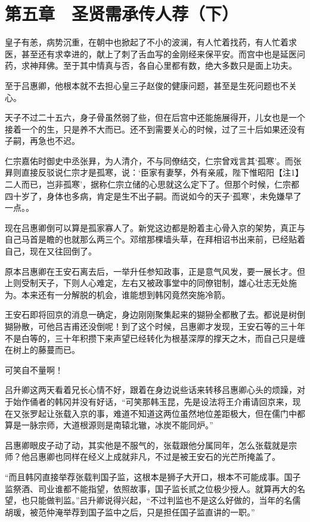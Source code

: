 \section{第五章　圣贤需承传人荐（下）}

皇子有恙，病势沉重，在朝中也掀起了不小的波澜，有人忙着找药，有人忙着求医，甚至还有求幸进的，献上了刺了舌血写的金刚经来保平安。而宫中也是延医问药，求神拜佛。至于其中情真与否，各自心里都有数，绝大多数只是面上功夫。

至于吕惠卿，他根本就不去担心皇三子赵俊的健康问题，甚至是生死问题也不关心。

天子不过二十五六，身子骨虽然弱了些，但在后宫中还能施展得开，儿女也是一个接着一个的生，只是养不大而已。还不到需要关心的时候，过了三十后如果还没有子嗣，再急也不迟。

仁宗嘉佑时御史中丞张昪，为人清介，不与同僚结交，仁宗曾戏言其‘孤寒’。而张昪则直接反驳说仁宗才是孤寒，说：‘臣家有妻孥，外有亲戚，陛下惟昭阳【注1】二人而已，岂非孤寒’，据称仁宗立储的心思就这么定下了。但那个时候，仁宗都四十岁了，身体也多病，肯定是生不出子嗣。而说如今的天子‘孤寒’，未免嫌早了一点。。

现在吕惠卿倒可以算是孤家寡人了。新党这边都是盼着主心骨入京的架势，真正与自己马首是瞻的也就那么两三个。邓绾那棵墙头草，在拜相诏书出来前，已经贴着自己，现在又往回倒了。

原本吕惠卿在王安石离去后，一举升任参知政事，正是意气风发，要一展长才。但上则受制天子，下则人心难定，左右又被政事堂中的同僚钳制，雄心壮志无处施为。本来还有一分解脱的机会，谁能想到韩冈竟然突施冷箭。

王安石即将回京的消息一确定，身边刚刚聚集起来的猢狲全都散了去。都说是树倒猢狲散，可他吕吉甫还没倒呢！到了这个时候，吕惠卿才发现，王安石等的三十年不是白等的，三十年积攒下来声望已经转化为根基深厚的撑天之木，而自己只是缠在树上的藤蔓而已。

可笑自不量啊！

吕升卿这两天看着兄长心情不好，跟着在身边说些话来转移吕惠卿心头的烦躁，对于始作俑者的韩冈并没有好话，“可笑那韩玉昆，先是设法将王介甫请回京来，现在又张罗起让张载入京的事，难道不知道这两位虽然地位差距极大，但在儒门中都算是一脉宗师，大道根源则是南辕北辙，冰炭不能同炉。”

吕惠卿眼皮子动了动，其实他是不服气的，张载跟他分属同年，怎么张载就是宗师？他吕惠卿也同样在经义上成就非凡，不过是被王安石的光芒所掩盖了。

“而且韩冈直接举荐张载判国子监，这根本是狮子大开口，根本不可能成事。国子监祭酒、司业谁都不能指望，依照故事，国子监长贰之位极少授人。就算再大的名望，也只能做判监。”吕升卿说得兴起，“不过判监也不是这么好做的，当年的名儒胡瑗，被范仲淹举荐到国子监中之后，只是担任国子监直讲的一职。”

